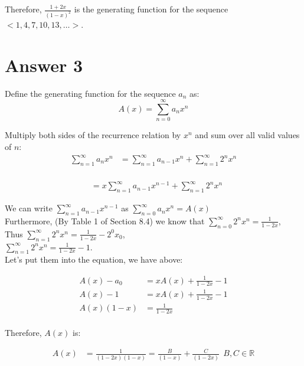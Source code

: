 \documentclass[12pt]{article}
\begin{document}
Therefore, \( \frac{1+2x}{(1-x)^2} \)  is the generating function for the sequence \( <1, 4, 7, 10, 13, \dots> \).



\section*{Answer 3}

Define the generating function for the sequence \( a_n \) as:
\[ A(x) = \sum_{n=0}^{\infty} a_n x^n \]

Multiply both sides of the recurrence relation by \( x^n \) and sum over all valid values of \( n \):
\begin{align*}
\sum_{n=1}^{\infty} a_n x^n &= \sum_{n=1}^{\infty} a_{n-1} x^n + \sum_{n=1}^{\infty} 2^n x^n \\
\end{align*}

\begin{align*}
&= x\sum_{n=1}^{\infty} a_{n-1} x^{n-1} + \sum_{n=1}^{\infty} 2^n x^n
\end{align*}

We can write \( \sum_{n=1}^{\infty} a_{n-1} x^{n-1}\) as \( \sum_{n=0}^{\infty} a_{n} x^{n} = A(x) \) \\

Furthermore, (By Table 1 of Section 8.4) we know that  \( \sum_{n=0}^{\infty} 2^n x^n = \frac{1}{1-2x} \),\\

Thus \( \sum_{n=1}^{\infty} 2^n x^n = \frac{1}{1-2x} - 2^0x_0\),\\

\( \sum_{n=1}^{\infty} 2^n x^n = \frac{1}{1-2x} - 1\).\\

Let's put them into the equation, we have above:

\begin{align*}
A(x)-a_{0} &= xA(x) + \frac{1}{1-2x} - 1\\
A(x)-1 &= xA(x) + \frac{1}{1-2x} - 1\\
A(x)(1-x) &= \frac{1}{1-2x}\\
\end{align*}

Therefore, \( A(x) \) is:

\begin{align*}
A(x)&= \frac{1}{(1-2x)(1-x)} = \frac{B}{(1-x)} + \frac{C}{(1-2x)}  \ \ B,C \in \mathbb{R}\\
\end{align*}
\end{document}
